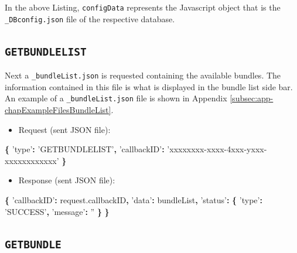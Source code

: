 \documentclass[]{book}
\newenvironment{Shaded}{\begin{snugshade}}{\end{snugshade}}
\newcommand{\AttributeTok}[1]{\textcolor[rgb]{0.77,0.63,0.00}{#1}}
\newcommand{\NormalTok}[1]{#1}
\newcommand{\OperatorTok}[1]{\textcolor[rgb]{0.81,0.36,0.00}{\textbf{#1}}}
\newcommand{\StringTok}[1]{\textcolor[rgb]{0.31,0.60,0.02}{#1}}
\newcommand{\VariableTok}[1]{\textcolor[rgb]{0.00,0.00,0.00}{#1}}
\providecommand{\tightlist}{%
  \setlength{\itemsep}{0pt}\setlength{\parskip}{0pt}}
\theoremstyle{definition}
\theoremstyle{definition}
\theoremstyle{definition}
\theoremstyle{remark}
\begin{document}
In the above Listing, \texttt{configData} represents the Javascript
object that is the \texttt{\_DBconfig.json} file of the respective
database.

\hypertarget{getbundlelist}{%
\subsection{\texorpdfstring{\texttt{GETBUNDLELIST}}{GETBUNDLELIST}}\label{getbundlelist}}

Next a \texttt{\_bundleList.json} is requested containing the available
bundles. The information contained in this file is what is displayed in
the bundle list side bar. An example of a \texttt{\_bundleList.json}
file is shown in Appendix \ref{subsec:app-chapExampleFilesBundleList}.

\begin{itemize}
\tightlist
\item
  Request (sent JSON file):
\end{itemize}

\begin{Shaded}
\begin{Highlighting}[]
\OperatorTok{\{}
  \StringTok{'type'}\OperatorTok{:} \StringTok{'GETBUNDLELIST'}\OperatorTok{,}
  \StringTok{'callbackID'}\OperatorTok{:} \StringTok{'xxxxxxxx-xxxx-4xxx-yxxx-xxxxxxxxxxxx'}
\OperatorTok{\}}
\end{Highlighting}
\end{Shaded}

\begin{itemize}
\tightlist
\item
  Response (sent JSON file):
\end{itemize}

\begin{Shaded}
\begin{Highlighting}[]
\OperatorTok{\{}
  \StringTok{'callbackID'}\OperatorTok{:} \VariableTok{request}\NormalTok{.}\AttributeTok{callbackID}\OperatorTok{,}
  \StringTok{'data'}\OperatorTok{:}\NormalTok{ bundleList}\OperatorTok{,}
  \StringTok{'status'}\OperatorTok{:} \OperatorTok{\{}
    \StringTok{'type'}\OperatorTok{:} \StringTok{'SUCCESS'}\OperatorTok{,}
    \StringTok{'message'}\OperatorTok{:} \StringTok{''}
  \OperatorTok{\}}
\OperatorTok{\}}
\end{Highlighting}
\end{Shaded}

\hypertarget{getbundle}{%
\subsection{\texorpdfstring{\texttt{GETBUNDLE}}{GETBUNDLE}}\label{getbundle}}
\end{document}
